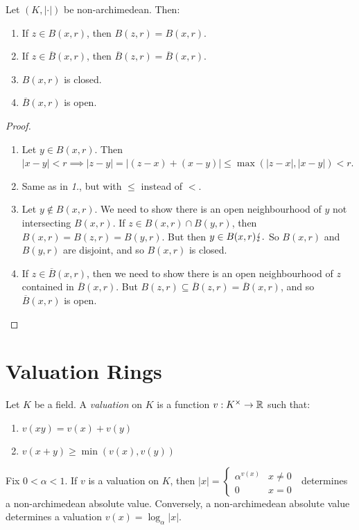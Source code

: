 \documentclass[10pt,a4paper]{article}
\begin{document}
\begin{lemma}
  Let $(K, |\cdot|)$ be non-archimedean. Then:
  \begin{enumerate}
    \item If $z \in B(x, r)$, then $B(z, r) = B(x, r)$.
    \item If $z \in \overline{B}(x, r)$, then $\overline{B}(z, r) = \overline{B}(x, r)$.
    \item $B(x, r)$ is closed.
    \item $\overline{B}(x, r)$ is open.
  \end{enumerate}
\end{lemma}
\begin{proof}\hspace*{0cm}
  \begin{enumerate}[label=\textit{\arabic*.}]
    \item Let $y \in B(x, r)$. Then $|x-y| < r \implies |z-y| = |(z-x) + (x-y)| \leq \max(|z-x|, |x-y|) < r$.
    \item Same as in \textit{1.}, but with $\leq$ instead of $<$.
    \item Let $y \notin B(x, r)$. We need to show there is an open neighbourhood of $y$ not intersecting $B(x, r)$. If $z \in B(x, r) \cap B(y, r)$, then $B(x, r) = B(z, r) = B(y, r)$. But then $y \in B(x, r) \lightning.$ So $B(x, r)$ and $B(y, r)$ are disjoint, and so $B(x, r)$ is closed.
    \item If $z \in \overline{B}(x, r)$, then we need to show there is an open neighbourhood of $z$ contained in $\overline{B}(x, r)$. But $B(z, r) \subseteq \overline{B}(z, r) = \overline{B}(x, r)$, and so $\overline{B}(x, r)$ is open.
  \end{enumerate}
\end{proof}

\section{Valuation Rings}
\begin{definition}
  Let $K$ be a field. A \emph{valuation} on $K$ is a function $v: K^\times \to \mathbb{R}$ such that:
  \begin{enumerate}
    \item $v(xy) = v(x) + v(y)$
    \item $v(x+y) \geq \min(v(x), v(y))$
  \end{enumerate}
\end{definition}
Fix $0 <\alpha<1$. If $v$ is a valuation on $K$, then $|x| = \begin{cases} \alpha^{v(x)} & x \neq 0 \\ 0 & x = 0\end{cases}\;$ determines a non-archimedean absolute value. Conversely, a non-archimedean absolute value determines a valuation $v(x) = \log_\alpha |x|$.
\end{document}
